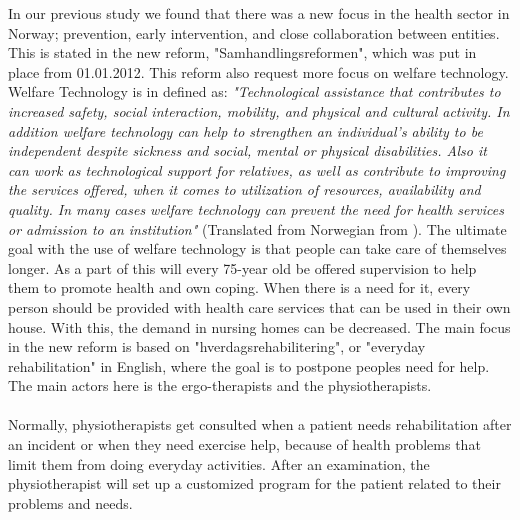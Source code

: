 In our previous study \cite{project} we found that there was a new focus in the health sector in Norway; prevention, early intervention, and close collaboration between entities. This is stated in the new reform, "Samhandlingsreformen", which was put in place from 01.01.2012. This reform also request more focus on welfare technology. Welfare Technology is in \cite{welfare} defined as: \emph{"Technological assistance that contributes to increased safety, social interaction, mobility,
and physical and cultural activity. In addition welfare technology can help to strengthen an individual's ability to be independent despite sickness and social, mental or physical disabilities. Also it can work as technological support for relatives, as well as contribute to improving the services offered, when it comes to utilization of resources, availability and quality. In many cases welfare technology can prevent the need for health services or admission to an institution"} (Translated from Norwegian from \cite{welfare}). The ultimate goal with the use of welfare technology is that people can take care of themselves longer.  As a part of this will every 75-year old be offered supervision to help them to promote health and own coping. When there is a need for it, every person should be provided with health care services that can be used in their own house. With this, the demand in nursing homes can be decreased. The main focus in the new reform is based on "hverdagsrehabilitering", or "everyday rehabilitation" in English, where the goal is to postpone peoples need for help. The main actors here is the ergo-therapists and the physiotherapists. \\ \\
Normally, physiotherapists get consulted when a patient needs rehabilitation after an incident or when they need exercise help, because of health problems that limit them from doing everyday activities. After an examination, the physiotherapist will set up a customized program for the patient related to their problems and needs.\\ \\

